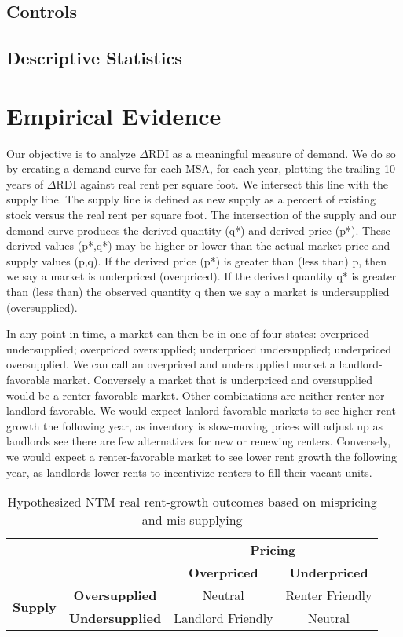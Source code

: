 \documentclass[sn-mathphys-num]{sn-jnl}%
\theoremstyle{thmstyleone}%
\theoremstyle{thmstyletwo}%
\theoremstyle{thmstylethree}%
\begin{document}
\subsection{Controls}
\subsection{Descriptive Statistics}


\section{Empirical Evidence}\label{sec2}
Our objective is to analyze $\Delta\text{RDI}$ as a meaningful measure of demand. We do so by creating a demand curve for each MSA, for each year, plotting the trailing-10 years of $\Delta\text{RDI}$ against real rent per square foot. We intersect this line with the supply line. The supply line is defined as new supply as a percent of existing stock versus the real rent per square foot. The intersection of the supply and our demand curve produces the derived quantity (q*) and derived price (p*). These derived values (p*,q*) may be higher or lower than the actual market price and supply values (p,q). If the derived price (p*) is greater than (less than) p, then we say a market is underpriced (overpriced). If the derived quantity q* is greater than (less than) the observed quantity q then we say a market is undersupplied (oversupplied).

In any point in time, a market can then be in one of four states: overpriced undersupplied; overpriced oversupplied; underpriced undersupplied; underpriced oversupplied. We can call an overpriced and undersupplied market a landlord-favorable market. Conversely a market that is underpriced and oversupplied would be a renter-favorable market. Other combinations are neither renter nor landlord-favorable. We would expect lanlord-favorable markets to see higher rent growth the following year, as inventory is slow-moving prices will adjust up as landlords see there are few alternatives for new or renewing renters. Conversely, we would expect a renter-favorable market to see lower rent growth the following year, as landlords lower rents to incentivize renters to fill their vacant units. 

\begin{table}[h!]
\centering
\begin{tabular}{cc|c|c|}
\multicolumn{2}{c}{} & \multicolumn{2}{c}{\textbf{Pricing}} \\
\multicolumn{2}{c}{} & \textbf{Overpriced} & \textbf{Underpriced} \\
\cmidrule{3-4}
\multirow{2}{*}{\textbf{Supply}} & \textbf{Oversupplied} & Neutral & Renter Friendly \\\cmidrule{2-4}
 & \textbf{Undersupplied} & Landlord Friendly & Neutral \\
\bottomrule
\end{tabular}
\caption{Hypothesized NTM real rent-growth outcomes based on mispricing and mis-supplying}
\end{table}
\end{document}
